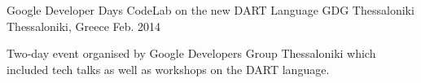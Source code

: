 \begin{cventries}
  \cventry
    {Google Developer Days CodeLab on the new DART Language} %
    {GDG Thessaloniki} %
    {Thessaloniki, Greece} %
    {Feb. 2014} %
    {
      \begin{cvitems} %
        \item {Two-day event organised by Google Developers Group Thessaloniki which included tech talks as well as workshops on the DART language.}
      \end{cvitems}
    }
    

\end{cventries}
